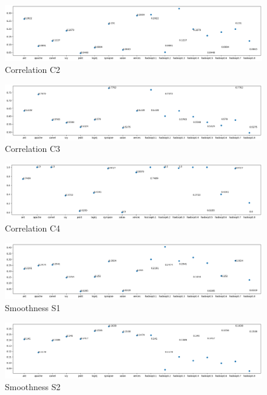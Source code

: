 \begin{figure}[h!]
    \includegraphics[width=\textwidth]{figures/correlation-C2.png}
    \caption{Correlation C2}
    \label{fig:correlation-c2-big}
\end{figure}

\begin{figure}[h!]
    \includegraphics[width=\textwidth]{figures/correlation-C3.png}
    \caption{Correlation C3}
    \label{fig:correlation-c3-big}
\end{figure}

\begin{figure}[h!]
    \includegraphics[width=\textwidth]{figures/correlation-C4.png}
    \caption{Correlation C4}
    \label{fig:correlation-c4-big}
\end{figure}


\begin{figure}[h!]
    \includegraphics[width=\textwidth]{figures/smoothness-S1.png}
    \caption{Smoothness S1}
    \label{fig:smoothness-s1-big}
\end{figure}

\begin{figure}[h!]
    \includegraphics[width=\textwidth]{figures/smoothness-S2.png}
    \caption{Smoothness S2}
    \label{fig:smoothness-s2-big}
\end{figure}

